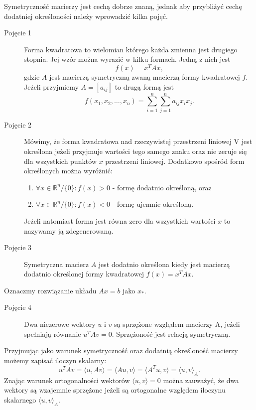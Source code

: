 \documentclass[a4paper,12pt]{book} %
\begin{document}
Symetryczność macierzy jest cechą dobrze znaną, jednak aby przybliżyć cechę dodatniej określoności należy wprowadzić kilka pojęć.
\begin{description}
\item[Pojęcie 1] Forma kwadratowa to wielomian którego każda zmienna jest drugiego stopnia. Jej wzór można wyrazić w kilku formach. Jedną z nich jest
$$f(x) = x^TAx,$$
gdzie $A$ jest macierzą symetryczną zwaną macierzą formy kwadratowej $f$. Jeżeli przyjmiemy $A = [a_{ij}]$ to drugą formą jest
$$f(x_1,x_2,\ldots,x_n) = \sum_{i=1}^n\sum_{j=1}^na_{ij}x_ix_j.$$

\item[Pojęcie 2] Mówimy, że forma kwadratowa nad rzeczywistej przestrzeni liniowej V jest określona jeżeli przyjmuje wartości tego samego znaku oraz nie zeruje się dla wszystkich punktów $x$ przestrzeni liniowej. Dodatkowo spośród form określonych można wyróżnić:
\begin{enumerate}
\item $\forall x \in \mathbb{R}^n/\{0\}: f(x) > 0$ - formę dodatnio określoną, oraz
\item $\forall x \in \mathbb{R}^n/\{0\}: f(x) < 0$ - formę ujemnie określoną.  
\end{enumerate}
Jeżeli natomiast forma jest równa zero dla wszystkich wartości $x$ to nazywamy ją zdegenerowaną.

\item[Pojęcie 3] Symetryczna macierz $A$ jest dodatnio określona kiedy jest macierzą dodatnio określonej formy kwadratowej $f(x) = x^TAx$.
\end{description}

Oznaczmy rozwiązanie układu $Ax = b$ jako $x_*.$
\begin{description}
\item[Pojęcie 4] Dwa niezerowe wektory $u$ i $v$ są sprzężone względem macierzy A, jeżeli spełniają równanie $u^TAv = 0.$ Sprzężoność jest relacją symetryczną.
\end{description}
Przyjmując jako warunek symetryczność oraz dodatnią określoność macierzy możemy zapisać iloczyn skalarny:
$$u^TAv = \langle u,Av\rangle = \langle Au, v \rangle = \langle A^Tu, v \rangle = \langle u, v \rangle_A.$$
Znając warunek ortogonalności wektorów $\langle u, v\rangle = 0$ można zauważyć, że dwa wektory są wzajemnie sprzężone jeżeli są ortogonalne względem iloczynu skalarnego $\langle u, v \rangle_A.$
\end{document}
